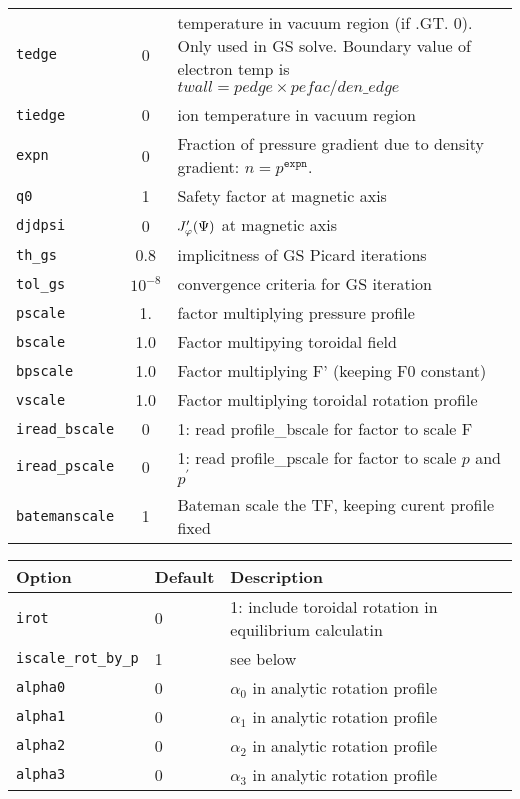 \begin{tabular}{lcp{3in}}
  \texttt{tedge} & 0     & temperature in vacuum region (if .GT. 0).  Only
                           used in GS solve.   Boundary value of electron temp
                           is $twall = pedge \times pefac/den\_edge $ \\
 \texttt{tiedge} & 0     & ion temperature in vacuum region  \\
 \texttt{expn}  & 0 & \parbox[t]{3in}{Fraction of pressure gradient due to
    density gradient: $n = p^\mathtt{expn}$.}\\
 \texttt{q0}    & 1	  & Safety factor at magnetic axis\\
 \texttt{djdpsi}& 0	  & $J_\varphi'(\Psi)$ at magnetic axis\\
 \texttt{th\_gs}& 0.8     & implicitness of GS Picard iterations\\
 \texttt{tol\_gs}& $10^{-8}$  & convergence criteria for GS iteration \\
  \texttt{pscale}  & 1.       & factor multiplying pressure profile \\
  \texttt{bscale}      &  1.0 & Factor multipying toroidal field\\
  \texttt{bpscale}     &  1.0 & Factor multiplying F' (keeping F0 constant) \\
  \texttt{vscale}      &  1.0 & Factor multiplying toroidal rotation profile \\
  \texttt{iread\_bscale}&  0   & 1: read profile\_bscale for factor to scale F \\
  \texttt{iread\_pscale} & 0   & 1: read profile\_pscale for factor to scale $p$ and $p^{\prime} $ \\
  \texttt{batemanscale} &  1   & Bateman scale the TF, keeping curent profile fixed \\

\end{tabular}

\begin{tabular}{llp{4in}}
  \textbf{Option}&\textbf{Default}&\textbf{Description}\\
  \hline
  \texttt{irot}         &  0   & 1: include toroidal rotation in equilibrium calculatin \\
  \texttt{iscale\_rot\_by\_p} & 1 & see below \\
  \texttt{alpha0}       &  0   & $\alpha_0$ in analytic rotation profile \\
  \texttt{alpha1}      	&  0   & $\alpha_1$ in analytic	rotation profile \\
  \texttt{alpha2}      	&  0   & $\alpha_2$ in analytic	rotation profile \\
  \texttt{alpha3}      	&  0   & $\alpha_3$ in analytic	rotation profile \\
\end{tabular}

